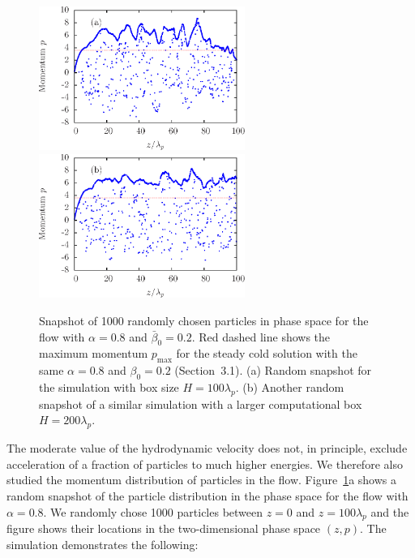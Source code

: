 \begin{figure}%
\begin{center}
  \includegraphics[width=0.6\textwidth]{pics/chap2/f5a.eps}\\
  \includegraphics[width=0.6\textwidth]{pics/chap2/f5b.eps}
\caption[Snapshot of particle distribution]{Snapshot of 1000 randomly chosen particles in phase space for the flow
with $\alpha=0.8$ and $\bar{\beta}_0=0.2$.
Red dashed line shows the maximum momentum $p_{\max}$ for the steady cold solution
with the same $\alpha=0.8$ and $\beta_0=0.2$ (Section~3.1).
(a) Random snapshot for the simulation with box size $H = 100\lambda_p$.
(b) Another random snapshot of a similar simulation with a larger computational box
$H = 200\lambda_p$.
}
\label{fig:phasetraj}
\end{center}
\end{figure}


The moderate value of the hydrodynamic velocity does not, in principle, exclude
acceleration of a fraction of particles to much higher energies. We therefore also
studied the momentum distribution of particles in the flow.
Figure~\ref{fig:phasetraj}a shows a random snapshot of the particle distribution in the
phase space for the flow with $\alpha=0.8$.
We randomly chose 1000 particles between $z=0$ and $z=100\lambda_p$
and the figure shows their locations in the two-dimensional phase space $(z,p)$.
The simulation demonstrates the following:

